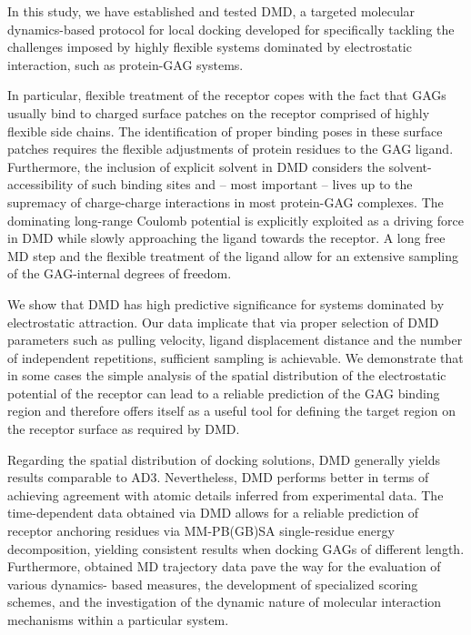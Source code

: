 In this study, we have established and tested DMD, a targeted molecular
dynamics-based protocol for local docking developed for specifically tackling
the challenges imposed by highly flexible systems dominated by electrostatic
interaction, such as protein-GAG systems.

In particular, flexible treatment of the receptor copes with the fact that GAGs
usually bind to charged surface patches on the receptor comprised of highly
flexible side chains. The identification of proper binding poses in these
surface patches requires the flexible adjustments of protein residues to the GAG
ligand. Furthermore, the inclusion of explicit solvent in DMD considers the
solvent-accessibility of such binding sites and -- most important -- lives up to
the supremacy of charge-charge interactions in most protein-GAG complexes. The
dominating long-range Coulomb potential is explicitly exploited as a driving
force in DMD while slowly approaching the ligand towards the receptor. A long
free MD step and the flexible treatment of the ligand allow for an extensive
sampling of the GAG-internal degrees of freedom.

We show that DMD has high predictive significance for systems dominated by
electrostatic attraction. Our data implicate that via proper selection of DMD
parameters such as pulling velocity, ligand displacement distance and the number
of independent repetitions, sufficient sampling is achievable. We demonstrate
that in some cases the simple analysis of the spatial distribution of the
electrostatic potential of the receptor can lead to a reliable prediction of the
GAG binding region and therefore offers itself as a useful tool for defining the
target region on the receptor surface as required by DMD.

Regarding the spatial distribution of docking solutions, DMD generally yields
results comparable to AD3. Nevertheless, DMD performs better in terms of
achieving agreement with atomic details inferred from experimental data. The
time-dependent data obtained via DMD allows for a reliable prediction of
receptor anchoring residues via MM-PB(GB)SA single-residue energy decomposition,
yielding consistent results when docking GAGs of different length. Furthermore,
obtained MD trajectory data pave the way for the evaluation of various dynamics-
based measures, the development of specialized scoring schemes, and the
investigation of the dynamic nature of molecular interaction mechanisms within a
particular system.
